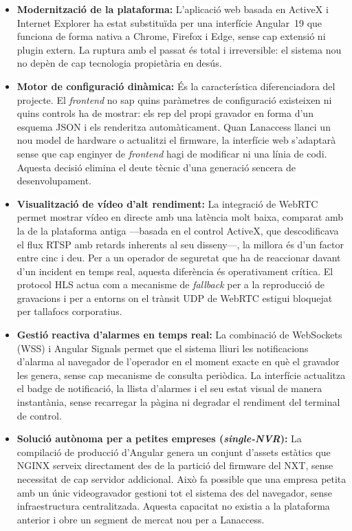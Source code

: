 \begin{itemize}
    \item \textbf{Modernització de la plataforma:} L'aplicació web basada en ActiveX i Internet Explorer ha estat substituïda per una interfície Angular~19 que funciona de forma nativa a Chrome, Firefox i Edge, sense cap extensió ni plugin extern. La ruptura amb el passat és total i irreversible: el sistema nou no depèn de cap tecnologia propietària en desús.

    \item \textbf{Motor de configuració dinàmica:} És la característica diferenciadora del projecte. El \textit{frontend} no sap quins paràmetres de configuració existeixen ni quins controls ha de mostrar: els rep del propi gravador en forma d'un esquema JSON i els renderitza automàticament. Quan Lanaccess llanci un nou model de hardware o actualitzi el firmware, la interfície web s'adaptarà sense que cap enginyer de \textit{frontend} hagi de modificar ni una línia de codi. Aquesta decisió elimina el deute tècnic d'una generació sencera de desenvolupament.

    \item \textbf{Visualització de vídeo d'alt rendiment:} La integració de WebRTC permet mostrar vídeo en directe amb una latència molt baixa, comparat amb la de la plataforma antiga —basada en el control ActiveX, que descodificava el flux RTSP amb retards inherents al seu disseny—, la millora és d'un factor entre cinc i deu. Per a un operador de seguretat que ha de reaccionar davant d'un incident en temps real, aquesta diferència és operativament crítica. El protocol HLS actua com a mecanisme de \textit{fallback} per a la reproducció de gravacions i per a entorns on el trànsit UDP de WebRTC estigui bloquejat per tallafocs corporatius.

    \item \textbf{Gestió reactiva d'alarmes en temps real:} La combinació de WebSockets (WSS) i Angular Signals permet que el sistema lliuri les notificacions d'alarma al navegador de l'operador en el moment exacte en què el gravador les genera, sense cap mecanisme de consulta periòdica. La interfície actualitza el badge de notificació, la llista d'alarmes i el seu estat visual de manera instantània, sense recarregar la pàgina ni degradar el rendiment del terminal de control.

    \item \textbf{Solució autònoma per a petites empreses (\textit{single-NVR}):} La compilació de producció d'Angular genera un conjunt d'assets estàtics que NGINX serveix directament des de la partició del firmware del NXT, sense necessitat de cap servidor addicional. Això fa possible que una empresa petita amb un únic videogravador gestioni tot el sistema des del navegador, sense infraestructura centralitzada. Aquesta capacitat no existia a la plataforma anterior i obre un segment de mercat nou per a Lanaccess.


\end{itemize}
